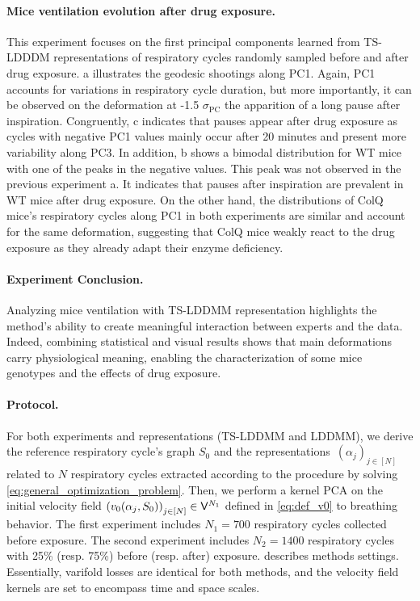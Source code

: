 \paragraph{Mice ventilation evolution after drug exposure.} 
This experiment focuses on the first principal components learned from TS-LDDDM representations of respiratory cycles randomly sampled before and after drug exposure. a illustrates the geodesic shootings along PC1. Again, PC1 accounts for variations in respiratory cycle duration, but more importantly, it can be observed on the deformation at -1.5 $\sigma_{\text{PC}}$ the apparition of a long pause after inspiration. Congruently, c indicates that pauses appear after drug exposure as cycles with negative PC1 values mainly occur after 20 minutes and present more variability along PC3. In addition, b shows a bimodal distribution for WT mice with one of the peaks in the negative values. This peak was not observed in the previous experiment a. It indicates that pauses after inspiration are prevalent in WT mice after drug exposure. On the other hand, the distributions of ColQ mice's respiratory cycles along PC1 in both experiments are similar and account for the same deformation, suggesting that ColQ mice weakly react to the drug exposure as they already adapt their enzyme deficiency.

\paragraph{Experiment Conclusion.}
Analyzing mice ventilation with TS-LDDMM representation highlights the method's ability to create meaningful interaction between experts and the data. Indeed, combining statistical and visual results shows that main deformations carry physiological meaning, enabling the characterization of some mice genotypes and the effects of drug exposure. 

\iffalse
\paragraph{Protocol.} For both experiments and representations (TS-LDDMM and LDDMM), we derive the reference respiratory cycle's graph $S_0$ and the representations $(\alpha_j)_{j\in[N]}$ related to $N$ respiratory cycles extracted according to the procedure \cite{germain2023unsupervised} by solving  \eqref{eq:general_optimization_problem}.
 Then, we perform a kernel PCA on the initial velocity field $\left(v_0(\alpha_j,S_0)\right)_{j\in[N]}\in \mathsf{V}^{N_1}$ defined in \eqref{eq:def_v0} to breathing behavior.
  The first experiment includes $N_1 = 700$ respiratory cycles collected before exposure. The second experiment includes $N_2 = 1400$ respiratory cycles with 25\% (resp. 75\%) before (resp. after) exposure.
    describes methods settings.
    Essentially, varifold losses are identical for both methods, and the velocity field kernels are set to encompass time and space scales. 

